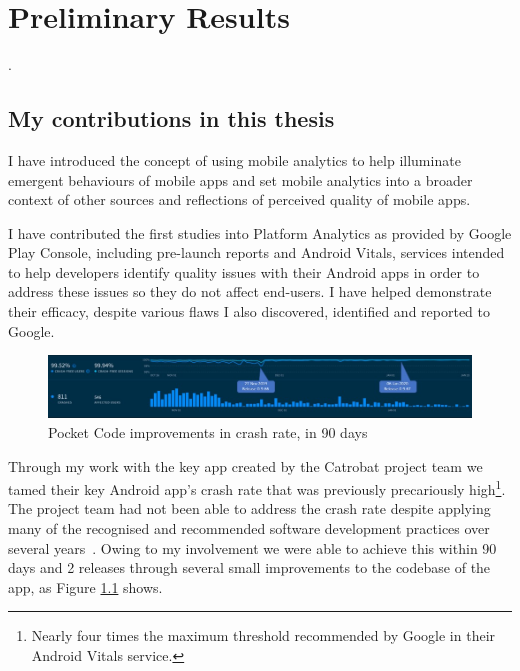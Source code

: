 \chapter{Preliminary Results}
.

\section{My contributions in this thesis}\label{my-contributions-in-this-thesis}
I have introduced the concept of using mobile analytics to help illuminate emergent behaviours of mobile apps and set mobile analytics into a broader context of other sources and reflections of perceived quality of mobile apps.

I have contributed the first studies into Platform Analytics as provided by Google Play Console, including pre-launch reports and Android Vitals, services intended to help developers identify quality issues with their Android apps in order to address these issues so they do not affect end-users. I have helped demonstrate their efficacy, despite various flaws I also discovered, identified and reported to Google. 

\begin{figure}[ht]
    \centering
    \includegraphics[width=\textwidth]{images/annotated_pocketcode_90_day_fabric_crashlytics_report.jpg}
    \caption{Pocket Code improvements in crash rate, in 90 days}
    \label{fig:pocketcode_improvements_in_crash_rate}
\end{figure}

Through my work with the key app created by the Catrobat project team we tamed their key Android app's crash rate that was previously precariously high\footnote{Nearly four times the maximum threshold recommended by Google in their Android Vitals service.}. The project team had not been able to address the crash rate despite applying many of the recognised and recommended software development practices over several years~\cite{adamsen2015systematic_catrobat, luhana2018streamlining, ali2019behavior_catrobat, ali2019using_catrobat, hirsch2019approach_catrobat, schranz2019_contributors_impact_on_a_foss_project_quality_catrobat, slany2014tinkering}. Owing to my involvement we were able to achieve this within 90 days and 2 releases through several small improvements to the codebase of the app, as Figure \ref{fig:pocketcode_improvements_in_crash_rate} shows.


